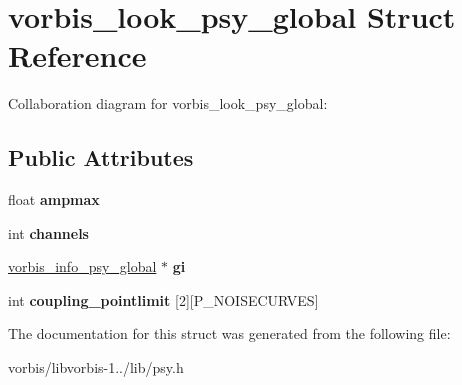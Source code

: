 \hypertarget{structvorbis__look__psy__global}{\section{vorbis\+\_\+look\+\_\+psy\+\_\+global Struct Reference}
\label{structvorbis__look__psy__global}
}


Collaboration diagram for vorbis\+\_\+look\+\_\+psy\+\_\+global\+:
\subsection*{Public Attributes}
\begin{DoxyCompactItemize}
\item 
\hypertarget{structvorbis__look__psy__global_a973febd6d21b9ea9b20c601adfff77e0}{float {\bfseries ampmax}}\label{structvorbis__look__psy__global_a973febd6d21b9ea9b20c601adfff77e0}

\item 
\hypertarget{structvorbis__look__psy__global_ac86c7cc0a9c62a5271dd309e3607c9c0}{int {\bfseries channels}}\label{structvorbis__look__psy__global_ac86c7cc0a9c62a5271dd309e3607c9c0}

\item 
\hypertarget{structvorbis__look__psy__global_a03368bba0e885407073c7cadb7ebd45e}{\hyperlink{structvorbis__info__psy__global}{vorbis\+\_\+info\+\_\+psy\+\_\+global} $\ast$ {\bfseries gi}}\label{structvorbis__look__psy__global_a03368bba0e885407073c7cadb7ebd45e}

\item 
\hypertarget{structvorbis__look__psy__global_a71b674604d210e99d9d007f90d5e8ea6}{int {\bfseries coupling\+\_\+pointlimit} \mbox{[}2\mbox{]}\mbox{[}P\+\_\+\+N\+O\+I\+S\+E\+C\+U\+R\+V\+E\+S\mbox{]}}\label{structvorbis__look__psy__global_a71b674604d210e99d9d007f90d5e8ea6}

\end{DoxyCompactItemize}


The documentation for this struct was generated from the following file\+:\begin{DoxyCompactItemize}
\item 
vorbis/libvorbis-\/1../lib/psy.\+h\end{DoxyCompactItemize}
